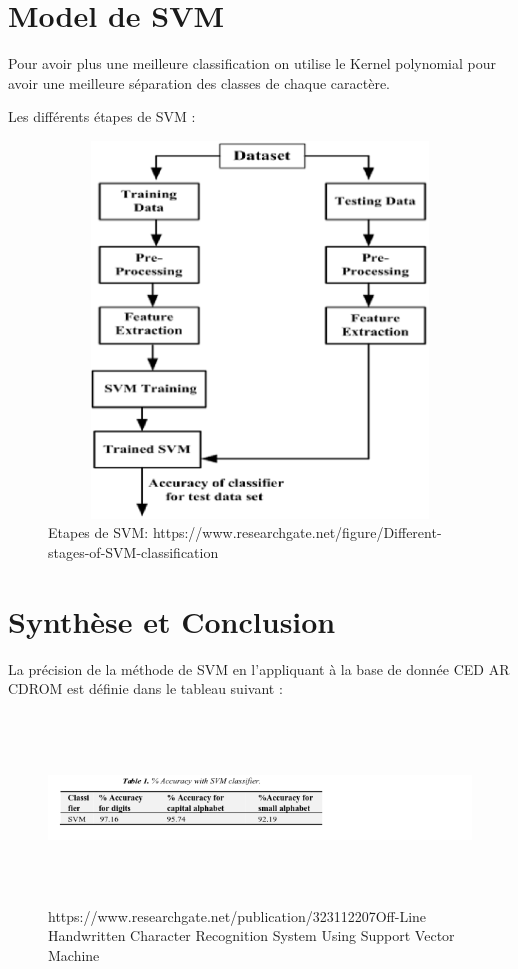 \documentclass[12pt, letterpaper]{article}
\begin{document}
\section{Model de SVM }
\par Pour avoir plus une meilleure classification on utilise le Kernel polynomial pour avoir une meilleure séparation des classes de chaque caractère.\\
\par Les différents étapes de SVM :\\
\begin{figure}[H]
    \includegraphics[width=12cm,height=10cm]{images/svm_methode.png}
    \caption{Etapes de SVM: https://www.researchgate.net/figure/Different-stages-of-SVM-classification}
    \label{fig:L1}
\end{figure}


\newpage
\section{Synthèse et Conclusion}
\par La précision de la méthode de SVM en l’appliquant à la base de donnée CED AR CDROM est définie dans le tableau suivant : 
\begin{figure}[H]
    \includegraphics[width=25cm,height=5cm]{images/accuracy.png}
    \caption{https://www.researchgate.net/publication/323112207Off-Line Handwritten Character Recognition System Using Support Vector Machine}
    \label{fig:L1}
\end{figure}
\end{document}
